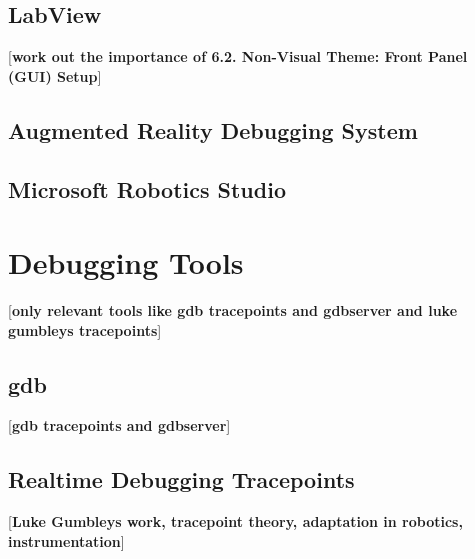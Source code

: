 \subsection{LabView}
[\textbf{work out the importance of 6.2. Non-Visual Theme: Front Panel (GUI) Setup}]
\cite{Whitley2001}
\subsection{Augmented Reality Debugging System}
\cite{Collett2010}
\subsection{Microsoft Robotics Studio}
\cite{Jackson2007}

\section{Debugging Tools}
[\textbf{only relevant tools like gdb tracepoints and gdbserver and luke gumbleys tracepoints}]
\subsection{gdb}
[\textbf{gdb tracepoints and gdbserver}]
\subsection{Realtime Debugging Tracepoints}
[\textbf{Luke Gumbleys work, tracepoint theory, adaptation in robotics, instrumentation}]
\cite{Gumbley2009}

